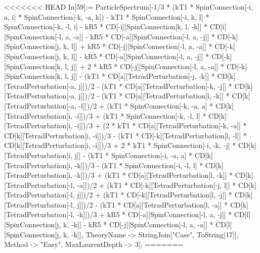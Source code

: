 <<<<<<< HEAD
In[59]:= ParticleSpectrum[-1/3 * (kT1 * SpinConnection[-i, a, i] * SpinConnection[-k, -a, k]) - kT1 * SpinConnection[-i, k, l] * SpinConnection[-k, -l, i] - kR5 * CD[-i][SpinConnection[k, l, -k]] * CD[i][SpinConnection[-l, a, -a]] - kR5 * CD[-a][SpinConnection[-l, a, -j]] * CD[-k][SpinConnection[j, k, l]] + kR5 * CD[-j][SpinConnection[-l, a, -a]] * CD[-k][SpinConnection[j, k, l]] - kR5 * CD[-a][SpinConnection[-l, a, -j]] * CD[-k][SpinConnection[k, l, j]] + 2 * kR5 * CD[-j][SpinConnection[-l, a, -a]] * CD[-k][SpinConnection[k, l, j]] - (kT1 * CD[a][TetradPerturbation[-j, -k]] * CD[k][TetradPerturbation[-a, j]])/2 - (kT1 * CD[a][TetradPerturbation[-k, -j]] * CD[k][TetradPerturbation[-a, j]])/2 - (kT1 * CD[a][TetradPerturbation[l, -k]] * CD[k][TetradPerturbation[-a, -l]])/2 + (kT1 * SpinConnection[-k, -a, a] * CD[k][TetradPerturbation[i, -i]])/3 + (kT1 * SpinConnection[-k, -l, l] * CD[k][TetradPerturbation[i, -i]])/3 + (2 * kT1 * CD[a][TetradPerturbation[-k, -a]] * CD[k][TetradPerturbation[i, -i]])/3 - (kT1 * CD[-k][TetradPerturbation[l, -l]] * CD[k][TetradPerturbation[i, -i]])/3 + 2 * kT1 * SpinConnection[-i, -k, -j] * CD[k][TetradPerturbation[i, j]] - (kT1 * SpinConnection[-i, -a, a] * CD[k][TetradPerturbation[i, -k]])/3 - (kT1 * SpinConnection[-i, -l, l] * CD[k][TetradPerturbation[i, -k]])/3 + (kT1 * CD[a][TetradPerturbation[l, -k]] * CD[k][TetradPerturbation[-l, -a]])/2 + (kT1 * CD[-k][TetradPerturbation[-j, l]] * CD[k][TetradPerturbation[-l, j]])/2 + (kT1 * CD[-k][TetradPerturbation[l, -j]] * CD[k][TetradPerturbation[-l, j]])/2 - (kT1 * CD[a][TetradPerturbation[l, -a]] * CD[k][TetradPerturbation[-l, -k]])/3 + kR5 * CD[-a][SpinConnection[-l, a, -j]] * CD[l][SpinConnection[j, k, -k]] - kR5 * CD[-j][SpinConnection[-l, a, -a]] * CD[l][SpinConnection[j, k, -k]], TheoryName -> StringJoin["Case", ToString[17]], Method -> "Easy", MaxLaurentDepth -> 3]; 
=======
